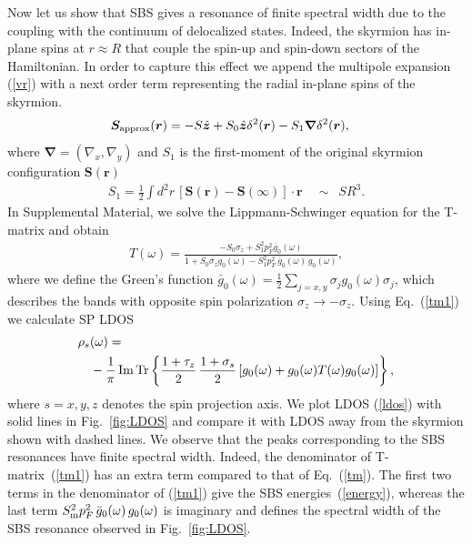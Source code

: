 \documentclass[twocolumn,showpacs,floatfix,longbibliography]{revtex4-1}
\begin{document}
Now let us show that SBS gives a resonance of finite spectral width due to the coupling with the continuum of delocalized states. Indeed, the skyrmion has in-plane spins at $r\approx R$ that couple the spin-up and spin-down sectors of the Hamiltonian. In order to capture this effect we append the multipole expansion (\ref{vr}) with a next order term  representing the radial in-plane spins of the skyrmion.
\begin{align}
	\bm S_{\rm approx}(\bm r) & =  - S \hat{\bm z} + S_0 \hat{\bm z} \delta^2(\bm r)-S_1 \bm \nabla \delta^2(\bm r), \label{vr1}
\end{align}
where  $\bm \nabla = (\nabla_x,\nabla_y)$ and $S_1$ is the first-moment of the original skyrmion configuration $\bm S(\bm r)$
\begin{align}
	S_1 = \frac{1}{2}\int  d^2r \, \left[\bm S(\bm r)-\bm S(\infty)\right] \cdot \bm r\quad \sim \,\,\,SR^3. \label{S1}
\end{align}
In Supplemental Material, we solve the Lippmann-Schwinger equation for the T-matrix and obtain
\begin{align}
	T(\omega) =   \frac{-S_0\sigma_z+S^2_1p_F^2\bar g_{0}(\omega)}{1+S_0\sigma_zg_{0}(\omega)-S^2_1p_F^2\,\bar g_{0}(\omega)\, g_{0}(\omega)}, \label{tm1}
\end{align}
where we define the Green's function $\bar g_0(\omega) = \frac{1}{2}\sum_{j=x,y} \sigma_j g_0(\omega) \sigma_j $, which describes the bands with opposite spin polarization $\sigma_z\rightarrow -\sigma_z$. Using Eq.~(\ref{tm1}) we calculate SP LDOS
\begin{align}
	\rho_s & (\omega) = \label{ldos} \\
	&-\frac{1}{\pi}\,{\rm Im}{\rm \,Tr} \left\{  \frac{1+\tau_z}{2}\,\frac{1+\sigma_s}{2} \left[g_0(\omega)+g_0(\omega) T(\omega) g_0(\omega)  \right]\right\},\nonumber
\end{align}
where $s=x,y,z$ denotes the spin projection axis. We plot LDOS (\ref{ldos}) with solid lines in Fig.~\ref{fig:LDOS} and compare it with LDOS away from the skyrmion shown with dashed lines. We observe that the peaks corresponding to the SBS resonances have finite spectral width. Indeed, the denominator of T-matrix~(\ref{tm1}) has an extra term compared to that of Eq.~(\ref{tm}). The first two terms in the denominator of (\ref{tm1}) give the SBS energies~(\ref{energy}), whereas the last term $S^2_{\rm m}p_F^2\,\bar g_{0}(\omega)\, g_{0}(\omega)$ is imaginary and defines the spectral width of the SBS resonance observed in Fig.~\ref{fig:LDOS}.
\end{document}
